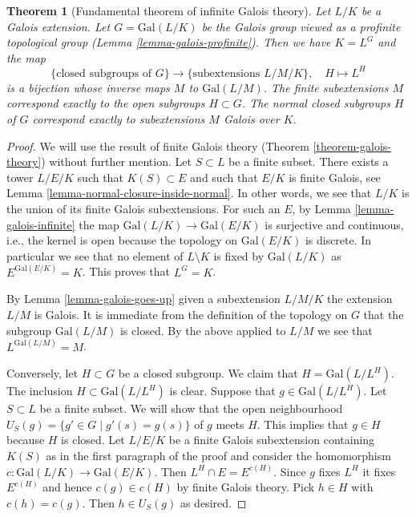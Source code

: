 \documentclass{stacks-project}
\theoremstyle{plain}
\newtheorem{theorem}[subsection]{Theorem}
\theoremstyle{definition}
\theoremstyle{remark}
\numberwithin{equation}{subsection}
\begin{document}
\begin{theorem}[Fundamental theorem of infinite Galois theory]
\label{theorem-inifinite-galois-theory}
Let $L/K$ be a Galois extension. Let $G = \text{Gal}(L/K)$
be the Galois group viewed as a profinite topological group
(Lemma \ref{lemma-galois-profinite}). Then we have $K = L^G$ and the map
$$
\{\text{closed subgroups of }G\}
\longrightarrow
\{\text{subextensions }L/M/K\},\quad
H \longmapsto L^H
$$
is a bijection whose inverse maps $M$ to $\text{Gal}(L/M)$.
The finite subextensions $M$ correspond exactly to the open
subgroups $H \subset G$. The normal closed subgroups $H$ of $G$
correspond exactly to subextensions $M$ Galois over $K$.
\end{theorem}

\begin{proof}
We will use the result of finite Galois theory
(Theorem \ref{theorem-galois-theory})
without further mention.
Let $S \subset L$ be a finite subset. There exists a tower
$L/E/K$ such that $K(S) \subset E$ and such that
$E/K$ is finite Galois, see Lemma \ref{lemma-normal-closure-inside-normal}.
In other words, we see that $L/K$ is the union of its finite
Galois subextensions.
For such an $E$, by Lemma \ref{lemma-galois-infinite}
the map $\text{Gal}(L/K) \to \text{Gal}(E/K)$ is surjective
and continuous, i.e., the kernel is open because the topology
on $\text{Gal}(E/K)$ is discrete.
In particular we see that no element of $L \setminus K$ is fixed by
$\text{Gal}(L/K)$ as $E^{\text{Gal}(E/K)} = K$.
This proves that $L^G = K$.

\medskip\noindent
By Lemma \ref{lemma-galois-goes-up} given a subextension $L/M/K$
the extension $L/M$ is Galois. It is immediate from the definition
of the topology on $G$ that the subgroup $\text{Gal}(L/M)$ is closed.
By the above applied to $L/M$ we see that $L^{\text{Gal}(L/M)} = M$.

\medskip\noindent
Conversely, let $H \subset G$ be a closed subgroup. We claim that
$H = \text{Gal}(L/L^H)$. The inclusion $H \subset \text{Gal}(L/L^H)$
is clear. Suppose that $g \in \text{Gal}(L/L^H)$. Let $S \subset L$
be a finite subset. We will show that the open neighbourhood
$U_S(g) = \{g' \in G \mid g'(s) = g(s)\}$ of $g$ meets $H$.
This implies that $g \in H$ because $H$ is closed.
Let $L/E/K$ be a finite Galois subextension containing $K(S)$
as in the first paragraph of the proof and consider the homomorphism
$c : \text{Gal}(L/K) \to \text{Gal}(E/K)$.
Then $L^H \cap E = E^{c(H)}$. Since $g$ fixes $L^H$ it fixes
$E^{c(H)}$ and hence $c(g) \in c(H)$ by finite Galois theory.
Pick $h \in H$ with $c(h) = c(g)$. Then $h \in U_S(g)$ as desired.


\end{proof}
\end{document}
